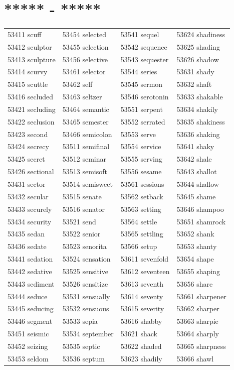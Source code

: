 \documentclass[10pt, oneside]{book}
\begin{document}
\begin{table}[h]
	\centering
	\section*{***** - *****}
	\begin{tabular}{l l l l}
53411 scuff &53454 selected &53541 sequel &53624 shadiness\\
53412 sculptor &53455 selection &53542 sequence &53625 shading\\
53413 sculpture &53456 selective &53543 sequester &53626 shadow\\
53414 scurvy &53461 selector &53544 series &53631 shady\\
53415 scuttle &53462 self &53545 sermon &53632 shaft\\
53416 secluded &53463 seltzer &53546 serotonin &53633 shakable\\
53421 secluding &53464 semantic &53551 serpent &53634 shakily\\
53422 seclusion &53465 semester &53552 serrated &53635 shakiness\\
53423 second &53466 semicolon &53553 serve &53636 shaking\\
53424 secrecy &53511 semifinal &53554 service &53641 shaky\\
53425 secret &53512 seminar &53555 serving &53642 shale\\
53426 sectional &53513 semisoft &53556 sesame &53643 shallot\\
53431 sector &53514 semisweet &53561 sessions &53644 shallow\\
53432 secular &53515 senate &53562 setback &53645 shame\\
53433 securely &53516 senator &53563 setting &53646 shampoo\\
53434 security &53521 send &53564 settle &53651 shamrock\\
53435 sedan &53522 senior &53565 settling &53652 shank\\
53436 sedate &53523 senorita &53566 setup &53653 shanty\\
53441 sedation &53524 sensation &53611 sevenfold &53654 shape\\
53442 sedative &53525 sensitive &53612 seventeen &53655 shaping\\
53443 sediment &53526 sensitize &53613 seventh &53656 share\\
53444 seduce &53531 sensually &53614 seventy &53661 sharpener\\
53445 seducing &53532 sensuous &53615 severity &53662 sharper\\
53446 segment &53533 sepia &53616 shabby &53663 sharpie\\
53451 seismic &53534 september &53621 shack &53664 sharply\\
53452 seizing &53535 septic &53622 shaded &53665 sharpness\\
53453 seldom &53536 septum &53623 shadily &53666 shawl\\
	\end{tabular}
 \end{table}
\end{document}
